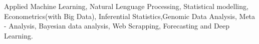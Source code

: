 


\begin{cvparagraph}
Applied Machine Learning, Natural Lenguage Processing, Statistical modelling, Econometrics(with Big Data), Inferential Statistics,Genomic Data Analysis, Meta - Analysis, Bayesian data analysis, Web Scrapping, Forecasting and Deep Learning.

\end{cvparagraph}
